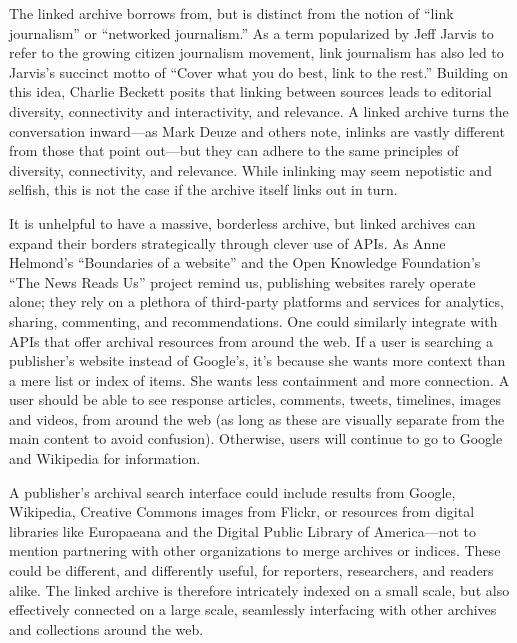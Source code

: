 The linked archive borrows from, but is distinct from the notion of ``link journalism'' or ``networked journalism.'' As a term popularized by Jeff Jarvis to refer to the growing citizen journalism movement, link journalism has also led to Jarvis's succinct motto of ``Cover what you do best, link to the rest.''\autocite{jarvis_new_2007,jarvis_networked_2006} Building on this idea, Charlie Beckett posits that linking between sources leads to editorial diversity, connectivity and interactivity, and relevance.\autocite{beckett_editorial_2010} A linked archive turns the conversation inward---as Mark Deuze and others note, inlinks are vastly different from those that point out---but they can adhere to the same principles of diversity, connectivity, and relevance. While inlinking may seem nepotistic and selfish, this is not the case if the archive itself links out in turn.

It is unhelpful to have a massive, borderless archive, but linked archives can expand their borders strategically through clever use of APIs. As Anne Helmond's ``Boundaries of a website'' and the Open Knowledge Foundation's ``The News Reads Us'' project remind us, publishing websites rarely operate alone; they rely on a plethora of third-party platforms and services for analytics, sharing, commenting, and recommendations.\autocite{helmond_exploring_2013,wehrmeyer_news_????} One could similarly integrate with APIs that offer archival resources from around the web. If a user is searching a publisher's website instead of Google's, it's because she wants more context than a mere list or index of items. She wants less containment and more connection. A user should be able to see response articles, comments, tweets, timelines, images and videos, from around the web (as long as these are visually separate from the main content to avoid confusion). Otherwise, users will continue to go to Google and Wikipedia for information.

A publisher's archival search interface could include results from Google, Wikipedia, Creative Commons images from Flickr, or resources from digital libraries like Europaeana and the Digital Public Library of America---not to mention partnering with other organizations to merge archives or indices. These could be different, and differently useful, for reporters, researchers, and readers alike. The linked archive is therefore intricately indexed on a small scale, but also effectively connected on a large scale, seamlessly interfacing with other archives and collections around the web.


